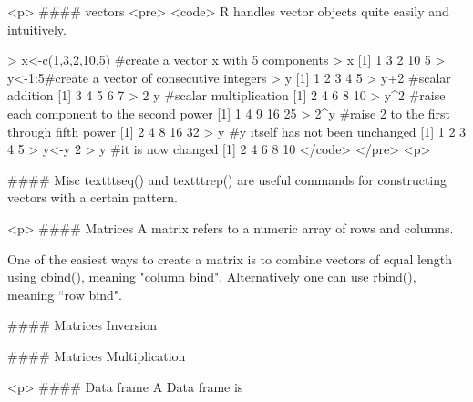 <p>
#### {vectors}
<pre>
<code>
R handles vector objects quite easily and intuitively.

> x<-c(1,3,2,10,5)    #create a vector x with 5 components
> x
[1]  1  3  2 10  5
> y<-1:5#create a vector of consecutive integers
> y
[1] 1 2 3 4 5
> y+2   #scalar addition
[1] 3 4 5 6 7
> 2     y   #scalar multiplication
[1]  2  4  6  8 10
> y^2   #raise each component to the second power
[1]  1  4  9 16 25
> 2^y   #raise 2 to the first through fifth power
[1]  2  4  8 16 32
> y     #y itself has not been unchanged
[1] 1 2 3 4 5
> y<-y     2
> y     #it is now changed
[1]  2  4  6  8 10
</code>
</pre>
<p>


#### {Misc}
texttt{seq()} and texttt{rep()} are useful commands for constructing vectors with a certain pattern.


<p>
#### {Matrices}
A matrix refers to a numeric array of rows and columns.

One of the easiest ways to create a matrix is to combine vectors of equal
length using cbind(), meaning "column bind". Alternatively one can use rbind(), meaning ``row bind".



#### {Matrices Inversion}

#### {Matrices Multiplication}


<p>
#### {Data frame}
A Data frame is

